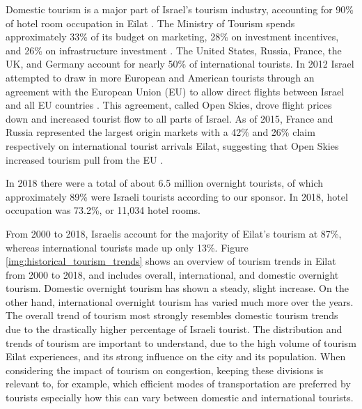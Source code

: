 \documentclass[12pt]{article}                               %
\begin{document}
Domestic tourism is a major part of Israel's tourism industry, accounting for 90\% of hotel room occupation in Eilat \cite{Benner2017}. The Ministry of Tourism spends approximately 33\% of its budget on marketing, 28\% on investment incentives, and 26\% on infrastructure investment \cite{Benner2017}. The United States, Russia, France, the UK, and Germany account for nearly 50\% of international tourists. In 2012 Israel attempted to draw in more European and American tourists through an agreement with the European Union (EU) to allow direct flights between Israel and all EU countries \cite{Benner2017}. This agreement, called Open Skies, drove flight prices down and increased tourist flow to all parts of Israel. As of 2015, France and Russia represented the largest origin markets with a 42\% and 26\% claim respectively on international tourist arrivals Eilat, suggesting that Open Skies increased tourism pull from the EU \cite{Benevolo2016}.

In 2018 there were a total of about 6.5 million overnight tourists, of which approximately 89\% were Israeli tourists according to our sponsor. In 2018, hotel occupation was 73.2\%, or 11,034 hotel rooms.

From 2000 to 2018, Israelis account for the majority of Eilat's tourism at 87\%, whereas international tourists made up only 13\%. Figure \ref{img:historical_tourism_trends} shows an overview of tourism trends in Eilat from 2000 to 2018, and includes overall, international, and domestic overnight tourism. Domestic overnight tourism has shown a steady, slight increase. On the other hand, international overnight tourism has varied much more over the years. The overall trend of tourism most strongly resembles domestic tourism trends due to the drastically higher percentage of Israeli tourist. The distribution and trends of tourism are important to understand, due to the high volume of tourism Eilat experiences, and its strong influence on the city and its population. When considering the impact of tourism on congestion, keeping these divisions is relevant to, for example, which efficient modes of transportation are preferred by tourists especially how this can vary between domestic and international tourists.
\end{document}
